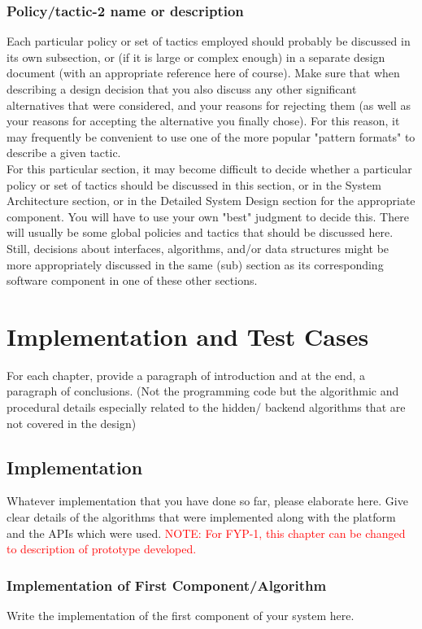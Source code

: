 \documentclass{FastFyp}
\begin{document}
\subsection{Policy/tactic-2 name or description}
Each particular policy or set of tactics employed should probably be discussed in its own subsection, or (if it is large or complex enough) in a separate design document (with an appropriate reference here of course). Make sure that when describing a design decision that you also discuss any other significant alternatives that were considered, and your reasons for rejecting them (as well as your reasons for accepting the alternative you finally chose). For this reason, it may frequently be convenient to use one of the more popular "pattern formats" to describe a given tactic.\\
For this particular section, it may become difficult to decide whether a particular policy or set of tactics should be discussed in this section, or in the System Architecture section, or in the Detailed System Design section for the appropriate component. You will have to use your own "best" judgment to decide this. There will usually be some global policies and tactics that should be discussed here. Still, decisions about interfaces, algorithms, and/or data structures might be more appropriately discussed in the same (sub) section as its corresponding software component in one of these other sections.

\chapter{Implementation and Test Cases}
For each chapter, provide a paragraph of introduction and at the end, a paragraph of conclusions. (Not the programming code but the algorithmic and procedural details especially related to the hidden/ backend algorithms that are not covered in the design)
\section{Implementation}
Whatever implementation that you have done so far, please elaborate here.
Give clear details of the algorithms that were implemented along with the platform and the APIs which were used. 
\textcolor{red}{NOTE: For FYP-1, this chapter can be changed to description of prototype developed.}
\subsection{Implementation of First Component/Algorithm}
Write the implementation of the first component of your system here.
\end{document}
